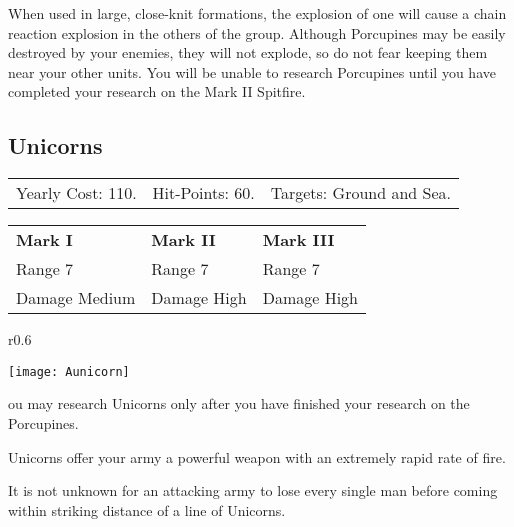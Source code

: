 
When used in large, close-knit formations, the explosion of one will cause a chain reaction explosion in the others of the group. Although Porcupines may be easily destroyed by your enemies, they will not explode, so do not fear keeping them near your other units. You will be unable to research Porcupines until you have completed your research on the Mark II Spitfire.

\clearpage  %

\subsection{\textsf{Unicorns}}


\begin{tabular}{p{1.264in} p{1.264in} p{1.264in}}
    Yearly Cost: 110. & Hit-Points: 60. & Targets: Ground and Sea.
\end{tabular}

\begin{tabular}{|p{1.264in} p{1.264in} p{1.264in}|}
    \hline
    \textbf{Mark I}    & \textbf{Mark II} & \textbf{Mark III} \\ 
    Range 7    & Range 7 & Range 7 \\ 
    Damage Medium & Damage High & Damage High \\ 
    \hline
\end{tabular}

\begin{wrapfigure}{r}{0.6\textwidth}
    \vspace{-20pt}
    \begin{center}
        \texttt{[image: Aunicorn]} %
    \end{center}
    \vspace{-20pt}
\end{wrapfigure}

ou may research Unicorns only after you have finished your research on the Porcupines.

Unicorns offer your army a powerful weapon with an extremely rapid rate of fire.


It is not unknown for an attacking army to lose every single man before coming within striking distance of a line of Unicorns.